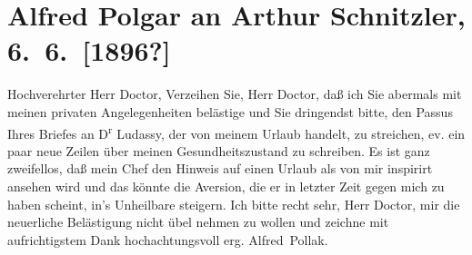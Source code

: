 

         
         \renewcommand{\erwaehntePersonen}{Personen: Julius von Gans-Ludassy, Alfred Polgar}
         \renewcommand{\erwaehnteOrte}{Orte: Wien}
         \renewcommand{\erwaehnteWerke}{Werke: Tagebuch}
               \section[Alfred Polgar an Arthur Schnitzler, 6. 6. {[}1896?{]}]{ Alfred Polgar an Arthur Schnitzler, 6. 6. {[}1896?{]}}\nopagebreak{}\rehead{ }\begin{ledgroupsized}[t]{13cm}\normalsize\beginnumbering{} \toendnotes[C]{\smallbreak\pagebreak[2]} 
\toendnotes[C]{\smallbreak}\pstart{}{\pb}Hochverehrter Herr Doctor,\pend\pstart
           Verzeihen Sie, Herr Doctor, daß ich Sie abermals mit meinen privaten Angelegenheiten
               belästige und Sie dringendst bitte, den Passus Ihres Briefes an D\textsuperscript{r}{ }Ludassy, der von meinem Urlaub handelt, zu
               streichen, ev. ein paar neue Zeilen über meinen Gesundheitszustand zu schreiben.\pend
           \pstart
           Es ist ganz zweifellos, daß mein Chef den Hinweis auf einen Urlaub als von mir
               inspirirt ansehen wird und das könnte die Aversion, die er in letzter Zeit gegen mich
               zu haben scheint, in’s Unheilbare steigern.\pend
           \pstart
           Ich bitte recht sehr, Herr Doctor, mir die neuerliche Belästigung nicht übel nehmen
               zu wollen und zeichne mit aufrichtigstem Dank\pend
           \pstart hochachtungsvoll erg. \spacefill\mbox{Alfred Pollak.}\pend{}\pstart
           \label{K_L00550-1v}
\end{ledgroupsized}
